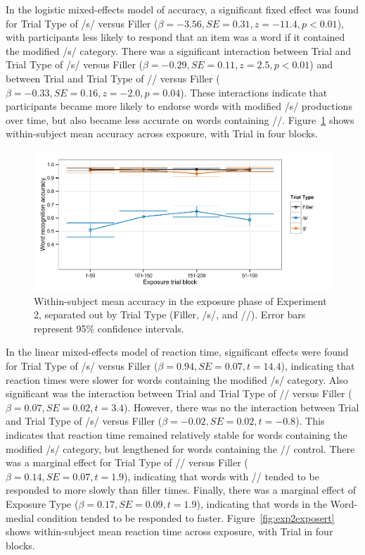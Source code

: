 In the logistic mixed-effects model of accuracy, a significant fixed effect was found for Trial Type of /s/ versus Filler ($\beta = -3.56, SE = 0.31, z = -11.4, p < 0.01$), with participants less likely to respond that an item was a word if it contained the modified /s/ category.
There was a significant interaction between Trial and Trial Type of /s/ versus Filler ($\beta = -0.29, SE = 0.11, z = 2.5, p < 0.01$) and between Trial and Trial Type of /\textesh/ versus Filler ($\beta = -0.33, SE = 0.16, z = -2.0, p = 0.04$).  
These interactions indicate that participants became more likely to endorse words with modified /s/ productions over time, but also became less accurate on words containing /\textesh/.  
Figure~\ref{fig:exp2exposeacc} shows within-subject mean accuracy across exposure, with Trial in four blocks.


\begin{figure}[!ht]
\caption{Within-subject mean accuracy in the exposure phase of Experiment 2, separated out by Trial Type (Filler, /s/, and /\textesh/). Error bars represent 95\% confidence intervals.}
\label{fig:exp2exposeacc}
\begin{center}
\includegraphics[width=\textwidth]{graphs/exp2_expacc}
\end{center}
\end{figure}

In the linear mixed-effects model of reaction time, significant effects were found for Trial Type of /s/ versus Filler ($\beta = 0.94, SE = 0.07, t = 14.4$), indicating that reaction times were slower for words containing the modified /s/ category.
Also significant was the interaction between Trial and Trial Type of /\textesh/ versus Filler ($\beta = 0.07, SE = 0.02, t = 3.4$).
However, there was no the interaction between Trial and Trial Type of /s/ versus Filler ($\beta = -0.02, SE = 0.02, t = -0.8$). 
This indicates that reaction time remained relatively stable for words containing the modified /s/ category, but lengthened for words containing the /\textesh/ control.  
There was a marginal effect for Trial Type of /\textesh/ versus Filler ($\beta = 0.14, SE = 0.07, t = 1.9$), indicating that words with /\textesh/ tended to be responded to more slowly than filler times.
Finally, there was a marginal effect of Exposure Type ($\beta = 0.17, SE = 0.09, t = 1.9$), indicating that words in the Word-medial condition tended to be responded to faster.
Figure~\ref{fig:exp2exposert} shows within-subject mean reaction time across exposure, with Trial in four blocks.

